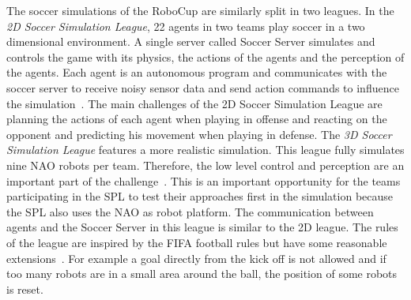The soccer simulations of the RoboCup are similarly split in two leagues. In the \textit{2D Soccer Simulation League}, 22 agents in two teams play soccer in a two dimensional environment. A single server called Soccer Server simulates and controls the game with its physics, the actions of the agents and the perception of the agents. Each agent is an autonomous program and communicates with the soccer server to receive noisy sensor data and send action commands to influence the simulation~\cite{soccer_simulation}. The main challenges of the 2D Soccer Simulation League are planning the actions of each agent when playing in offense and reacting on the opponent and predicting his movement when playing in defense. The \textit{3D Soccer Simulation League} features a more realistic simulation. This league fully simulates nine NAO robots per team. Therefore, the low level control and perception are an important part of the challenge~\cite{soccer_simulation_low_level}. This is an important opportunity for the teams participating in the SPL to test their approaches first in the simulation because the SPL also uses the NAO as robot platform. The communication between agents and the Soccer Server in this league is similar to the 2D league. The rules of the league are inspired by the FIFA football rules but have some reasonable extensions~\cite{soccer_rules_3d}. For example a goal directly from the kick off is not allowed and if too many robots are in a small area around the ball, the position of some robots is reset.\\
